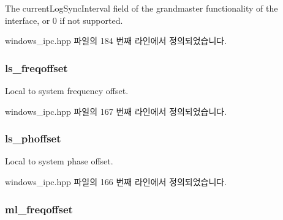 The current\+Log\+Sync\+Interval field of the grandmaster functionality of the interface, or 0 if not supported. 



windows\+\_\+ipc.\+hpp 파일의 184 번째 라인에서 정의되었습니다.

\subsubsection[{\texorpdfstring{ls\+\_\+freqoffset}{ls_freqoffset}}]{ ls\+\_\+freqoffset\hspace{0.3cm}{\ttfamily [inherited]}}\hypertarget{class_offset_a396f365f5e7c66610f076359c5d99c6e}{}\label{class_offset_a396f365f5e7c66610f076359c5d99c6e}


Local to system frequency offset. 



windows\+\_\+ipc.\+hpp 파일의 167 번째 라인에서 정의되었습니다.

\subsubsection[{\texorpdfstring{ls\+\_\+phoffset}{ls_phoffset}}]{ ls\+\_\+phoffset\hspace{0.3cm}{\ttfamily [inherited]}}\hypertarget{class_offset_a092b9f356daa2757877b51e4084366be}{}\label{class_offset_a092b9f356daa2757877b51e4084366be}


Local to system phase offset. 



windows\+\_\+ipc.\+hpp 파일의 166 번째 라인에서 정의되었습니다.

\subsubsection[{\texorpdfstring{ml\+\_\+freqoffset}{ml_freqoffset}}]{ ml\+\_\+freqoffset\hspace{0.3cm}{\ttfamily [inherited]}}\hypertarget{class_offset_aafeb4d0fa7d3cb53ee3686b804e47617}{}\label{class_offset_aafeb4d0fa7d3cb53ee3686b804e47617}


